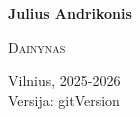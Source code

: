 \thispagestyle{empty}
\begin{center}
    \null
    \textbf{Julius Andrikonis}

    \Large\textsc{Dainynas}\normalsize

    Vilnius, 2025-2026\\
    Versija: {{gitVersion}}
\end{center}
\cleardoublepage
